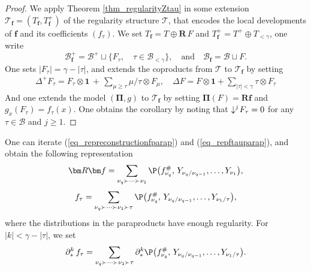 \documentclass[11pt]{preprint}
\newcommand{\mcB}{\mathcal{B}}
\def\PPi{\boldsymbol{\Pi}}
\def\eqref#1{(\ref{#1})}
\newcommand{\bfR}{\mathbf{R}}
\newcommand{\scrT}{\mathscr{T}}
\begin{document}
	\begin{proof}
		We apply Theorem \ref{thm_regularityZtau} in some extension $\scrT_{\bm f}=(T_{\bm f}, T_{\bm f}^+)$ of the regularity structure $\scrT$, that encodes the local developments of ${\bm f}$ and its coefficients $(f_\tau)$.
		We set $T_{\bm f}=T\oplus \bfR\, F$ and $T_{\bm f}^+=T^+\oplus T_{<\gamma}$, one write
		$$
		\mcB_{\bm f}^+ = \mcB^+ \sqcup \big\{ F_\tau, \quad \tau\in\mcB_{<\gamma}   \big\}, \quad \text{and}\quad \mcB_{\bm f } = \mcB \sqcup {F}.
		$$
		One sets $|F_\tau|=\gamma-|\tau|$, and extends the coproducts from $\scrT$ to $\scrT_{\bm f}$ by setting
		\begin{align*}
		\Delta^{\!+} F_\tau =  F_\tau \otimes \mathbf{1} \, + \,   \sum_{\mu\geq\tau} \mu/\tau\otimes F_\mu, \quad
		\Delta F = F\otimes \mathbf{ 1} + \sum_{|\tau|<\gamma} \tau \otimes F_\tau
		\end{align*}
		And one extends the model ${ (\PPi,g)}$ to $\scrT_{\bm f}$  by setting $\PPi(F)={\bm R}{\bm f}$ and ${ g}_x(F_\tau) = f_\tau(x) $. One obtains the corollary by noting that $\downarrow^j\hspace{-2pt}F_\tau=0$ for any $\tau\in\mcB$ and $j\geq 1$.	\end{proof}
	One can iterate  \eqref{eq_repreconstructionfparap} and \eqref{eq_repftauparap}, and obtain the following representation
	\begin{equation}
		{\bm R}{\bm f} = \sum_{\nu_q\succ\dots\succ\nu_1} \P\big( f_{\nu_q}^\#, \, Y_{\nu_q/\nu_{q-1}},\dots, Y_{\nu_1}\big),
	\end{equation}
	\begin{equation}
		f_\tau = \sum_{\nu_q \succ \dots\succ\nu_1\succ\tau} \P\big( f_{\nu_q}^\#, \, Y_{\nu_q/\nu_{q-1}},\dots, Y_{\nu_1/\tau}\big),
	\end{equation}
 where the distributions in the paraproducts have enough regularity.
	For $|k|<\gamma-|\tau|$, we set 
	\begin{equation}
		\partial^k_* \, f_\tau  = \sum_{\nu_q \succ \dots\succ\nu_1\succ\tau} \partial^k_*\P\big( f_{\nu_q}^\#, \, Y_{\nu_q/\nu_{q-1}},\dots, Y_{\nu_1/\tau}\big).
	\end{equation}
	
\end{document}
